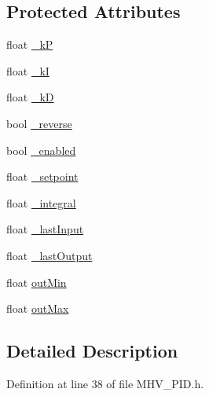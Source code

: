 \subsection*{\-Protected \-Attributes}
\begin{DoxyCompactItemize}
\item 
float \hyperlink{class_m_h_v___p_i_d_a2987b7582914a11ec39c38c2c2f8bb4f}{\-\_\-k\-P}
\item 
float \hyperlink{class_m_h_v___p_i_d_a47e47fe3d120325d9b12e205a274dcaa}{\-\_\-k\-I}
\item 
float \hyperlink{class_m_h_v___p_i_d_a64e69c4f8d1823d16314c88f98a4e18b}{\-\_\-k\-D}
\item 
bool \hyperlink{class_m_h_v___p_i_d_ae47baf90291256480ae57cbbc1ed917c}{\-\_\-reverse}
\item 
bool \hyperlink{class_m_h_v___p_i_d_a17e676a4ac1b18dcf30417b73265e87f}{\-\_\-enabled}
\item 
float \hyperlink{class_m_h_v___p_i_d_a46322bf586cac91fef5c2e38f269c718}{\-\_\-setpoint}
\item 
float \hyperlink{class_m_h_v___p_i_d_a26def3787ab18a8681c361720090b0df}{\-\_\-integral}
\item 
float \hyperlink{class_m_h_v___p_i_d_aa649c3528fb35b99ac6ce0dca338fcfb}{\-\_\-last\-Input}
\item 
float \hyperlink{class_m_h_v___p_i_d_a8464b83c97658e1f78a0c927476af6de}{\-\_\-last\-Output}
\item 
float \hyperlink{class_m_h_v___p_i_d_a4298ba8305fd0e43abd95481801e6487}{out\-Min}
\item 
float \hyperlink{class_m_h_v___p_i_d_a0a31a7a38d1257dd94ce8cb875bad616}{out\-Max}
\end{DoxyCompactItemize}


\subsection{\-Detailed \-Description}


\-Definition at line 38 of file \-M\-H\-V\-\_\-\-P\-I\-D.\-h.



